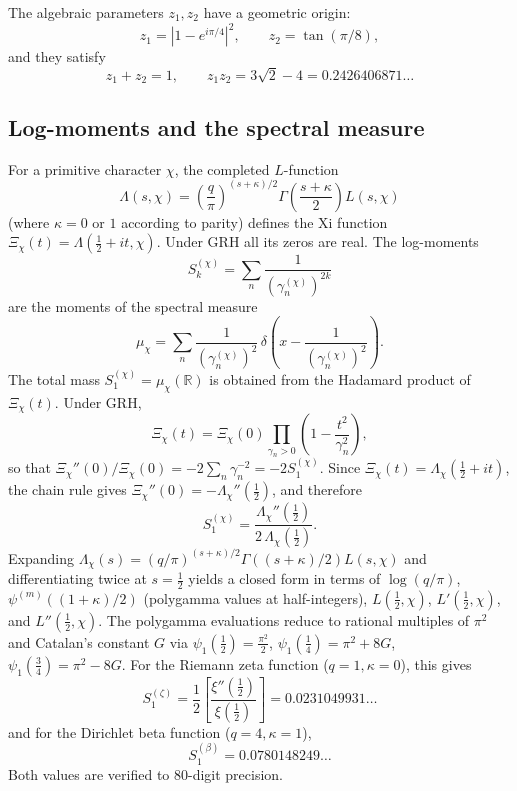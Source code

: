\documentclass[11pt,a4paper]{article}
\theoremstyle{plain}
\theoremstyle{definition}
\theoremstyle{remark}
\numberwithin{equation}{section}
\numberwithin{table}{section}
\newcommand{\R}{\mathbb{R}}
\begin{document}
The algebraic parameters $z_1,z_2$ have a geometric origin:
\begin{equation}
  z_1 = |1-e^{i\pi/4}|^2,\qquad z_2 = \tan(\pi/8),
\end{equation}
and they satisfy
\begin{equation}
  z_1+z_2=1,\qquad z_1 z_2 = 3\sqrt{2}-4 = 0.2426406871\ldots
\end{equation}

\subsection{Log-moments and the spectral measure}

For a primitive character $\chi$, the completed $L$-function
\begin{equation}
  \Lambda(s,\chi) =
  \left(\frac{q}{\pi}\right)^{(s+\kappa)/2}
  \Gamma\!\left(\frac{s+\kappa}{2}\right)L(s,\chi)
\end{equation}
(where $\kappa=0$ or $1$ according to parity) defines the Xi function
$\Xi_\chi(t)=\Lambda(\tfrac12+it,\chi)$.  Under GRH all its zeros are real.
The log-moments
\begin{equation}
  S_k^{(\chi)} = \sum_n \frac{1}{(\gamma_n^{(\chi)})^{2k}}
\end{equation}
are the moments of the spectral measure
\begin{equation}
  \mu_\chi = \sum_n \frac{1}{(\gamma_n^{(\chi)})^2}\,
  \delta\!\left(x-\frac{1}{(\gamma_n^{(\chi)})^2}\right).
\end{equation}
The total mass $S_1^{(\chi)}=\mu_\chi(\R)$ is obtained from the Hadamard
product of $\Xi_\chi(t)$.  Under GRH,
\begin{equation}
  \Xi_\chi(t) = \Xi_\chi(0)\prod_{\gamma_n>0}
  \left(1-\frac{t^2}{\gamma_n^2}\right),
\end{equation}
so that $\Xi_\chi''(0)/\Xi_\chi(0) = -2\sum_n \gamma_n^{-2} = -2S_1^{(\chi)}$.
Since $\Xi_\chi(t) = \Lambda_\chi(\tfrac12+it)$, the chain rule gives
$\Xi_\chi''(0) = -\Lambda_\chi''(\tfrac12)$, and therefore
\begin{equation}
\label{eq:S1-Lambda}
  S_1^{(\chi)} = \frac{\Lambda_\chi''(\tfrac12)}{2\,\Lambda_\chi(\tfrac12)}.
\end{equation}
Expanding $\Lambda_\chi(s) = (q/\pi)^{(s+\kappa)/2}\Gamma((s+\kappa)/2)L(s,\chi)$
and differentiating twice at $s=\tfrac12$ yields a closed form in terms
of $\log(q/\pi)$, $\psi^{(m)}((1+\kappa)/2)$ (polygamma values at
half-integers), $L(\tfrac12,\chi)$, $L'(\tfrac12,\chi)$, and
$L''(\tfrac12,\chi)$.  The polygamma evaluations reduce to rational
multiples of $\pi^2$ and Catalan's constant $G$ via
$\psi_1(\tfrac12)=\tfrac{\pi^2}{2}$,
$\psi_1(\tfrac14)=\pi^2+8G$,
$\psi_1(\tfrac34)=\pi^2-8G$.
For the Riemann zeta function ($q=1,\kappa=0$), this gives
\begin{equation}
  S_1^{(\zeta)} = \frac{1}{2}\left[\frac{\xi''(\tfrac12)}{\xi(\tfrac12)}\right]
  = 0.0231049931\ldots
\end{equation}
and for the Dirichlet beta function ($q=4,\kappa=1$),
\begin{equation}
  S_1^{(\beta)} = 0.0780148249\ldots 
\end{equation}
Both values are verified to 80-digit precision.
\end{document}
